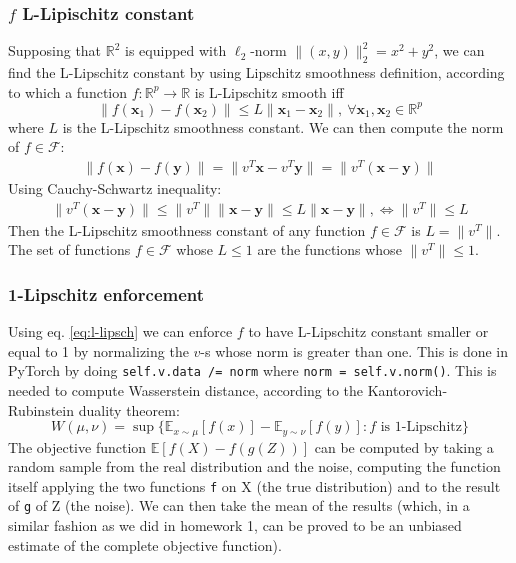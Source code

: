 \documentclass[12pt]{article}
\begin{document}
\subsubsection{\texorpdfstring{$f$}{Lg} L-Lipischitz constant}
Supposing that $\mathbb{R}^{2}$ is equipped with $\ell_{2}$-norm $\lVert (x, y) \rVert_{2}^{2} = x^{2} + y^{2}$, we can find the L-Lipschitz constant by using Lipschitz smoothness definition, according to which a function $f : \mathbb{R}^p \rightarrow \mathbb{R}$ is L-Lipschitz smooth iff
\begin{equation} \label{def:lipschitz}
    \lVert f(\mathbf{x}_{1}) - f(\mathbf{x}_{2}) \rVert \leq L \lVert \mathbf{x}_{1} - \mathbf{x}_{2} \rVert, 
        \ \forall \mathbf{x}_{1}, \mathbf{x}_{2} \in \mathbb{R}^{p}
\end{equation}
where $L$ is the L-Lipschitz smoothness constant. We can then compute the norm of $f \in \mathcal{F}$:
\begin{gather}
    \lVert f(\mathbf{x}) - f(\mathbf{y}) \rVert = \lVert v^{T} \mathbf{x} - v^{T} \mathbf{y} \rVert = 
        \lVert v^{T} (\mathbf{x} - \mathbf{y}) \rVert
\end{gather}
Using Cauchy-Schwartz inequality:
\begin{gather} \label{eq:l-lipsch}
        \lVert v^{T} (\mathbf{x} - \mathbf{y}) \rVert \leq \lVert v^{T} \rVert \lVert \mathbf{x} - \mathbf{y} \rVert \leq L \lVert \mathbf{x} - \mathbf{y} \rVert, \iff \lVert v^{T} \rVert \leq L
\end{gather}
Then the L-Lipschitz smoothness constant of any function $f \in \mathcal{F}$ is $L = \lVert v^{T} \rVert$. The set of functions $f \in \mathcal{F}$ whose $L \leq 1$ are the functions whose $\lVert v^{T} \rVert \leq 1$.

\subsubsection{1-Lipschitz enforcement}

Using eq. \eqref{eq:l-lipsch} we can enforce $f$ to have L-Lipschitz constant smaller or equal to 1 by normalizing the $v$-s whose norm is greater than one. This is done in PyTorch by doing \texttt{self.v.data /= norm} where \texttt{norm = self.v.norm()}. This is needed to compute Wasserstein distance, according to the Kantorovich-Rubinstein duality theorem:
\begin{equation}
    W(\mu, \nu) = \sup{\{ \mathbb{E}_{x \sim \mu} [f(x)] - \mathbb{E}_{y \sim \nu} [f(y)] : f \text{ is 1-Lipschitz} \}} \label{eq:wasserstein}
\end{equation}{}
The objective function $\mathbb{E}[f(X) - f(g(Z))]$ can be computed by taking a random sample from the real distribution and the noise, computing the function itself applying the two functions \texttt{f} on X (the true distribution) and to the result of \texttt{g} of Z (the noise). We can then take the mean of the results (which, in a similar fashion as we did in homework 1, can be proved to be an unbiased estimate of the complete objective function).
\end{document}
